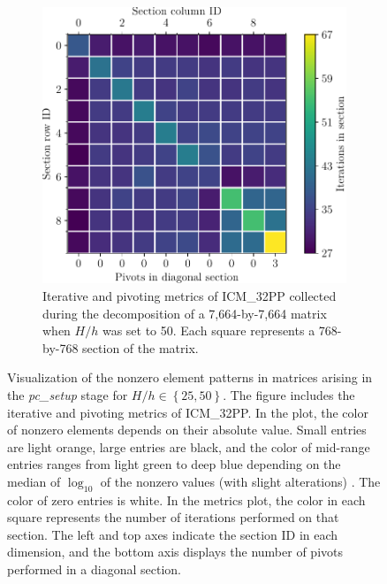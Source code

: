 \begin{figure}[ht!]
\begin{subfigure}[t]{0.51\textwidth}
		\includegraphics[width=\textwidth]{images/ch03/input-matrices/bddcml-benchmark/poc-50_4_2_icmxpp_metrics.pdf}
		\caption{Iterative and pivoting metrics of ICM\_32PP collected during the decomposition of a 7,664-by-7,664 matrix when $H/h$ was set to 50.
			Each square represents a 768-by-768 section of the matrix.
		}
		\label{Figure:comparing-decomposers-and-solvers->bddcml-benchmark->benchmark-results->speedup-comparison-of-decomposers-in-pc-setup-stage->speedup-comparison->ICM_32PP->50-4-2->metrics}
	\end{subfigure}

	\caption{Visualization of the nonzero element patterns in matrices arising in the \textit{pc\_setup} stage for $H/h \in \left\{25, 50\right\}$.
		The figure includes the iterative and pivoting metrics of ICM\_32PP.
		In the  plot, the color of nonzero elements depends on their absolute value.
		Small entries are light orange, large entries are black, and the color of mid-range entries ranges from light green to deep blue depending on the median of $\log_{10}$ of the nonzero values (with slight alterations) \cite{Davis2006}.
		The color of zero entries is white.
		In the metrics plot, the color in each square represents the number of iterations performed on that section.
		The left and top axes indicate the section ID in each dimension, and the bottom axis displays the number of pivots performed in a diagonal section.
	}
	\label{Figure:comparing-decomposers-and-solvers->bddcml-benchmark->benchmark-results->speedup-comparison-of-decomposers-in-pc-setup-stage->speedup-comparison->ICM_32PP->LU-and-metrics-examples}
\end{figure}

